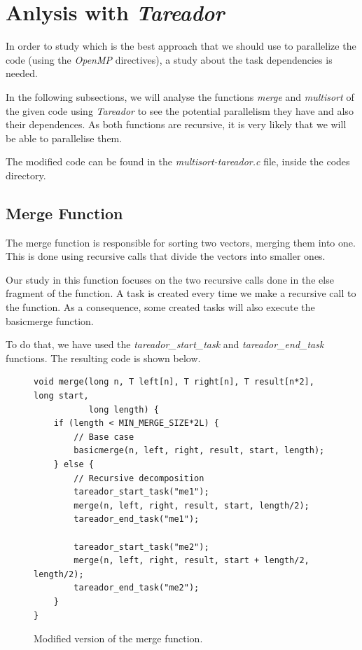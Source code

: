 \documentclass[12pt, a4paper]{article}
\begin{document}
\section{Anlysis with \textit{Tareador}}

In order to study which is the best approach that we should use to parallelize the code (using the \textit{OpenMP} directives), a study about the task dependencies is needed.

In the following subsections, we will analyse the functions \textit{merge} and \textit{multisort} of the given code using \textit{Tareador} to see the potential parallelism they have and also their dependences. As both functions are recursive, it is very likely that we will be able to parallelise them.

The modified code can be found in the \textit{multisort-tareador.c} file, inside the codes directory.

\subsection{Merge Function}

The merge function is responsible for sorting two vectors, merging them into one. This is done using recursive calls that divide the vectors into smaller ones.

Our study in this function focuses on the two recursive calls done in the else fragment of the function. A task is created every time we make a recursive call to the function. As a consequence, some created tasks will also execute the basicmerge function.

To do that, we have used the \textit{tareador\_start\_task} and \textit{tareador\_end\_task} functions. The resulting code is shown below.

\begin{figure}[H]
\begin{lstlisting}
void merge(long n, T left[n], T right[n], T result[n*2], long start,
		   long length) {
    if (length < MIN_MERGE_SIZE*2L) {
        // Base case
        basicmerge(n, left, right, result, start, length);
    } else {
        // Recursive decomposition
        tareador_start_task("me1");
        merge(n, left, right, result, start, length/2);
        tareador_end_task("me1");

        tareador_start_task("me2");
        merge(n, left, right, result, start + length/2, length/2);
        tareador_end_task("me2");
    }
}
\end{lstlisting}

\label{code:merge_tareador}
\caption{Modified version of the merge function.}
\end{figure}
\end{document}
